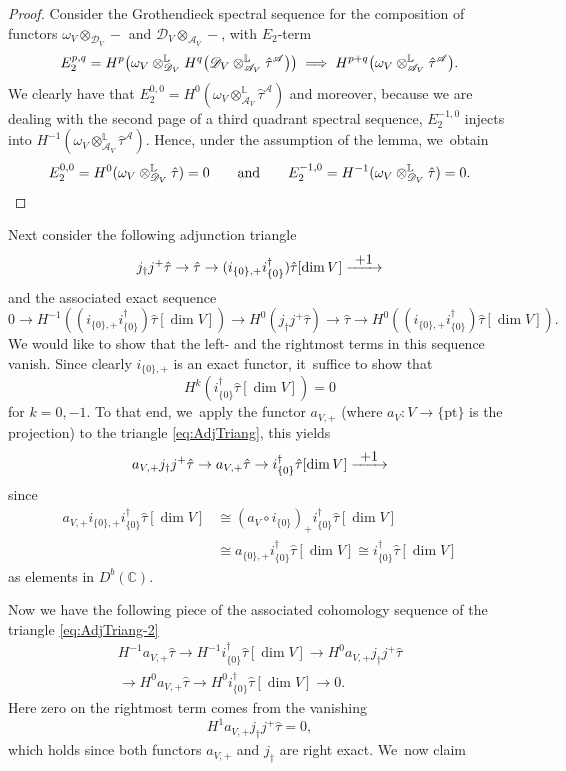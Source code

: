 \documentclass[JEP,XML,SOM,Unicode,published]{cedram}
\let\mathds\mathbb
\newcommand{\To}[1]{\mathchoice{\xrightarrow{\textstyle\kern4pt#1\kern3pt}}{\xrightarrow{\,#1\,}}{}{}}
\newcommand{\dC}{{\mathds C}}\let\C\dC
\newcommand{\dL}{{\mathbb L}}
\newcommand{\cA}{\mathscr{A}}
\newcommand{\cD}{\mathscr{D}}
\let\originalleft\left
\let\originalright\right
\renewcommand{\left}{\mathopen{}\mathclose\bgroup\originalleft}
\renewcommand{\right}{\aftergroup\egroup\originalright}
\begin{document}
\begin{proof}
Consider the Grothendieck spectral sequence for the composition of functors
$\omega_V \otimes_{\cD_V} - $ and $\cD_V\otimes_{\cA_V} -$, with $E_2$-term
\[
E_2^{p,q} = H^p\left(\omega_V \otimes_{\cD_V}^\dL H^q \left(\cD_V\otimes^\dL_{\cA_V} \hat{\tau}^\cA\right)\right) \implies
H^{p+q}\left(\omega_V\otimes^\dL_{\cA_V} \hat{\tau}^\cA\right).
\]
We clearly have that $E_2^{0,0}=H^0(\omega_V\otimes^\dL_{\cA_V} \hat{\tau}^\cA)$ and moreover, because we are dealing with the second page of a third quadrant spectral sequence, $E_2^{-1,0}$ injects into
$H^{-1}(\omega_V\otimes^\dL_{\cA_V} \hat{\tau}^\cA)$. Hence, under the assumption of the lemma, we~obtain
\[
E_2^{0,0} = H^0(\omega_V \otimes^\dL_{\cD_V} \hat{\tau}) =0
\quad\quad
\textup{and}
\quad\quad
E_2^{-1,0} = H^{-1}(\omega_V \otimes^\dL_{\cD_V} \hat{\tau}) =0.\qedhere
\]
\end{proof}

Next consider the following adjunction triangle
\begin{equation}\label{eq:AdjTriang}
j_\dag j^+ \hat\tau \to \hat\tau \to
(i_{\{0\},+} i_{\{0\}}^\dag)\hat\tau[\dim V] \To{+1}
\end{equation}
and the associated exact sequence
\[
0
\to H^{-1}((i_{\{0\},+} i_{\{0\}}^\dag)\hat\tau[\dim V])
\to H^0(j_\dag j^+ \hat\tau)
\to \hat\tau
\to H^0((i_{\{0\},+} i_{\{0\}}^\dag)\hat\tau[\dim V]).
\]
We would like to show that the left- and the rightmost terms in this sequence vanish.
Since clearly $i_{\{0\},+}$ is an exact functor, it~suffice to show that
\[
H^k(i_{\{0\}}^\dag\hat{\tau}[\dim V])=0
\]
for $k=0,-1$. To that end, we~apply the functor $a_{V,+}$ (where
$a_V\colon V\to \{\mathrm{pt}\}$ is the projection) to the triangle
\eqref{eq:AdjTriang}, this yields
\begin{equation}\label{eq:AdjTriang-2}
a_{V,+}j_\dag j^+ \hat\tau \to a_{V,+}\hat\tau \to
i_{\{0\}}^\dag \hat\tau[\dim V] \To{+1}
\end{equation}
since
\begin{align*}
a_{V,+} i_{\{0\},+} i_{\{0\}}^\dag \hat\tau[\dim V] &\cong 
(a_V\circ i_{\{0\}})_+ i_{\{0\}}^\dag \hat\tau[\dim V] \\
&\cong a_{\{0\},+} i_{\{0\}}^\dag \hat\tau[\dim V] \cong
i_{\{0\}}^\dag \hat\tau[\dim V]
\end{align*}
as elements in $D^b(\dC)$.

Now we have the following piece of the associated cohomology sequence of the triangle \eqref{eq:AdjTriang-2}
\begin{multline}\label{eq:CohomSequenceAv}
H^{-1} a_{V,+} \hat\tau
\to H^{-1} i_{\{0\}}^\dag \hat\tau[\dim V]
\to H^0 a_{V,+} j_\dag j^+ \hat\tau \\
\to H^0 a_{V,+} \hat\tau
\to H^0 i_{\{0\}}^\dag\hat\tau[\dim V]
\to 0.
\end{multline}
Here zero on the rightmost term comes from the vanishing
\[
H^1 a_{V,+} j_\dag j^+ \hat\tau=0,
\]
which holds since both functors $a_{V,+}$ and $j_\dag $ are right exact. We~now claim
\end{document}
